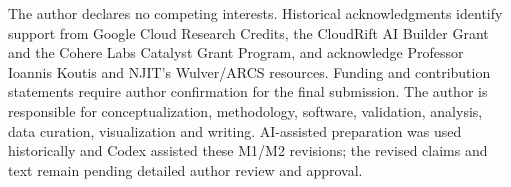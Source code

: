 \documentclass[acmsmall,screen]{acmart}
\begin{document}
The author declares no competing interests. Historical acknowledgments
identify support from Google Cloud Research Credits, the CloudRift AI Builder
Grant and the Cohere Labs Catalyst Grant Program, and acknowledge Professor
Ioannis Koutis and NJIT's Wulver/ARCS resources. Funding and contribution
statements require author confirmation for the final submission. The author
is responsible for conceptualization, methodology, software, validation,
analysis, data curation, visualization and writing. AI-assisted preparation
was used historically and Codex assisted these M1/M2 revisions; the revised
claims and text remain pending detailed author review and approval.



\end{document}
